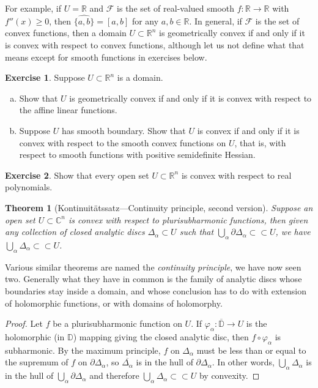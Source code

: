 \documentclass[12pt,openany]{book}
\newcommand{\C}{{\mathbb{C}}}
\newcommand{\R}{{\mathbb{R}}}
\newcommand{\D}{{\mathbb{D}}}
\newcommand{\sF}{{\mathscr{F}}}
\theoremstyle{plain}
\newtheorem{thm}{Theorem}[section]
\theoremstyle{remark}
\theoremstyle{definition}
\newenvironment{exbox}{%
    \def\FrameCommand{\vrule width 1pt \relax\hspace{10pt}}%
    \MakeFramed{\advance\hsize-\width\FrameRestore}%
}{%
    \endMakeFramed
}
\newenvironment{exparts}{%
    \leavevmode\begin{enumerate}[a),noitemsep,topsep=0pt,parsep=0pt,partopsep=0pt]
}{%
    \end{enumerate}
}
\theoremstyle{exercise}
\newtheorem{exercise}{Exercise}[section]
\theoremstyle{example}
\begin{document}
For example, if $U=\R$ and $\sF$ is the set of real-valued smooth
$f \colon \R \to \R$ with $f''(x) \geq 0$, then
$\widehat{\{ a, b \}} = [a,b]$ for any $a,b \in \R$.
In general, if $\sF$ is the set of convex functions, then
a domain $U \subset \R^n$ is geometrically convex if and only if it is
convex with respect to convex functions, although let us not define
what that means except for smooth functions in exercises below.

\begin{exbox}
\begin{exercise} \label{exercise:geomconvexfuncs}
Suppose $U \subset \R^n$ is a domain.
\begin{exparts}
\item
Show that $U$
is geometrically convex if and only if it is
convex with respect to the affine linear functions.
\item
Suppose $U$
has smooth boundary.
Show that $U$ is
convex if and only if it is
convex with respect to the smooth convex functions on $U$,
that is, with respect to smooth functions with positive semidefinite Hessian.
\end{exparts}
\end{exercise}

\begin{exercise}
Show that every open set $U \subset \R^n$ is convex with respect to real
polynomials.
\end{exercise}
\end{exbox}

\begin{thm}[Kontinuit\"atssatz---Continuity
principle, second version]
\label{thm:contprinciple2}
Suppose an open set $U \subset \C^n$ is convex with respect to plurisubharmonic
functions,
then given any collection of closed analytic discs $\Delta_\alpha \subset U$
such that $\bigcup_\alpha \partial \Delta_\alpha \subset \subset U$,
we have
$\bigcup_\alpha \Delta_\alpha \subset \subset U$.
\end{thm}

Various similar theorems are named the \emph{continuity principle},
we have now seen two.
Generally what they have in common is the family of analytic discs whose
boundaries stay inside a domain, and whose conclusion has to do
with extension of holomorphic functions, or with domains of holomorphy.

\begin{proof}
Let $f$ be a plurisubharmonic function on $U$.  If $\varphi_\alpha \colon
\overline{\D} \to U$ is the holomorphic (in $\D$) mapping giving the closed
analytic disc, then $f \circ \varphi_\alpha$ is subharmonic.
By the maximum principle,
$f$ on $\Delta_\alpha$ must be less than or equal to the supremum
of $f$ on $\partial \Delta_\alpha$, so $\overline{\Delta_\alpha}$
is in the hull of
$\partial \Delta_\alpha$.
In other words,
$\bigcup_\alpha \Delta_\alpha$ is in the hull of
$\bigcup_\alpha \partial \Delta_\alpha$ and therefore
$\bigcup_\alpha \Delta_\alpha \subset \subset U$ by convexity.
\end{proof}
\end{document}
